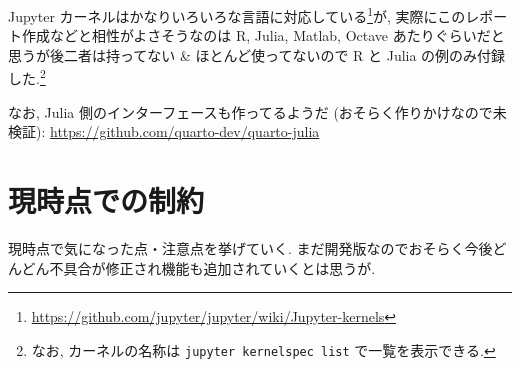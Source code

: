\documentclass[
  letterpaper,
  DIV=11,
  pandoc,
  ja=standard,
  jafont=noto-otf]{bxjsarticle}
\begin{document}
Jupyter カーネルはかなりいろいろな言語に対応している\footnote{\url{https://github.com/jupyter/jupyter/wiki/Jupyter-kernels}}が,
実際にこのレポート作成などと相性がよさそうなのは R, Julia, Matlab,
Octave あたりぐらいだと思うが後二者は持ってない \&
ほとんど使ってないので R と Julia の例のみ付録した.\footnote{なお,
  カーネルの名称は \texttt{jupyter\ kernelspec\ list}
  で一覧を表示できる.}

なお, Julia 側のインターフェースも作ってるようだ
(おそらく作りかけなので未検証):
\url{https://github.com/quarto-dev/quarto-julia}

\hypertarget{ux73feux6642ux70b9ux3067ux306eux5236ux7d04}{%
\section{現時点での制約}\label{ux73feux6642ux70b9ux3067ux306eux5236ux7d04}}

現時点で気になった点・注意点を挙げていく.
まだ開発版なのでおそらく今後どんどん不具合が修正され機能も追加されていくとは思うが.
\end{document}

